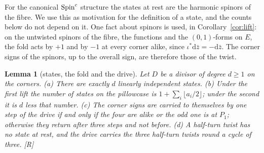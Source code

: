 \documentclass[11pt,a4paper]{article}
\theoremstyle{plain}
\newtheorem{lemma}[theorem]{Lemma}
\theoremstyle{definition}
\theoremstyle{remark}
\newcommand{\rigR}{[\textup{R}]}
\begin{document}
For the canonical $\text{Spin}^c$ structure the states at rest are the harmonic spinors of the fibre. We use this as motivation for the definition of a state, and the counts below do not depend on it. One fact about spinors is used, in Corollary~\ref{cor:lift}: on the untwisted spinors of the fibre, the functions and the $(0,1)$-forms on $E$, the fold acts by $+1$ and by $-1$ at every corner alike, since $\iota^{*}\mathrm{d}\bar z=-\mathrm{d}\bar z$. The corner signs of the spinors, up to the overall sign, are therefore those of the twist.

\begin{lemma}[states, the fold and the drive]\label{lem:states}
Let $D$ be a divisor of degree $d\geq1$ on the corners. (a) There are exactly $d$ linearly independent states. (b) Under the first lift the number of states on the pillowcase is $1+\sum_{i}\lfloor a_{i}/2\rfloor$; under the second it is $d$ less that number. (c) The corner signs are carried to themselves by one step of the drive if and only if the four are alike or the odd one is at $P_{1}$; otherwise they return after three steps and not before. (d) A half-turn twist has no state at rest, and the drive carries the three half-turn twists round a cycle of three. \rigR
\end{lemma}
\end{document}
